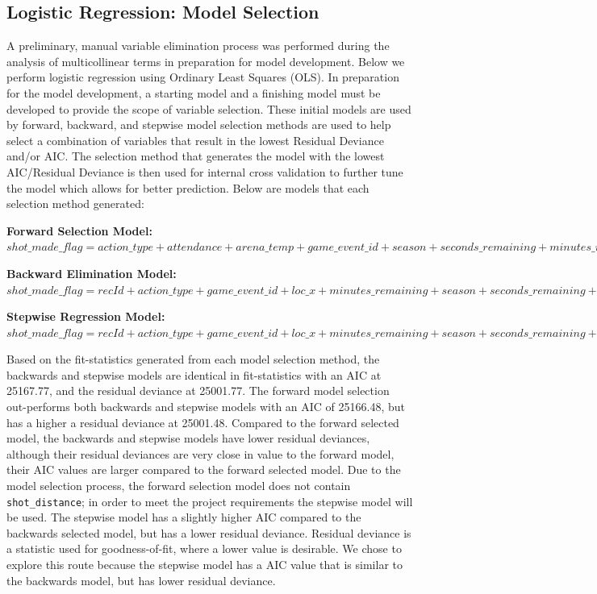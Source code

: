 \documentclass[american,]{article}
\begin{document}
\hypertarget{logistic-regression-model-selection}{%
\subsection{\texorpdfstring{\textbf{Logistic Regression: Model Selection}}{Logistic Regression: Model Selection}}\label{logistic-regression-model-selection}}

A preliminary, manual variable elimination process was performed during the analysis of multicollinear terms in preparation for model development. Below we perform logistic regression using Ordinary Least Squares (OLS). In preparation for the model development, a starting model and a finishing model must be developed to provide the scope of variable selection. These initial models are used by forward, backward, and stepwise model selection methods are used to help select a combination of variables that result in the lowest Residual Deviance and/or AIC. The selection method that generates the model with the lowest AIC/Residual Deviance is then used for internal cross validation to further tune the model which allows for better prediction. Below are models that each selection method generated:

\textbf{Forward Selection Model:}
\(shot\_made\_flag = action\_type + attendance + arena\_temp + game\_event\_id + season + seconds\_remaining + minutes\_remaining + loc\_y + game\_date + loc\_x\)

\textbf{Backward Elimination Model:}
\(shot\_made\_flag = recId + action\_type + game\_event\_id + loc\_x + minutes\_remaining + season + seconds\_remaining + shot\_distance + game\_date + shot\_id + attendance + arena\_temp\)

\textbf{Stepwise Regression Model:}
\(shot\_made\_flag = recId + action\_type + game\_event\_id + loc\_x + minutes\_remaining + season + seconds\_remaining + shot\_distance + game\_date + shot\_id + attendance + arena\_temp\)

Based on the fit-statistics generated from each model selection method, the backwards and stepwise models are identical in fit-statistics with an AIC at 25167.77, and the residual deviance at 25001.77. The forward model selection out-performs both backwards and stepwise models with an AIC of 25166.48, but has a higher a residual deviance at 25001.48. Compared to the forward selected model, the backwards and stepwise models have lower residual deviances, although their residual deviances are very close in value to the forward model, their AIC values are larger compared to the forward selected model. Due to the model selection process, the forward selection model does not contain \texttt{shot\_distance}; in order to meet the project requirements the stepwise model will be used. The stepwise model has a slightly higher AIC compared to the backwards selected model, but has a lower residual deviance. Residual deviance is a statistic used for goodness-of-fit, where a lower value is desirable. We chose to explore this route because the stepwise model has a AIC value that is similar to the backwards model, but has lower residual deviance.
\end{document}
